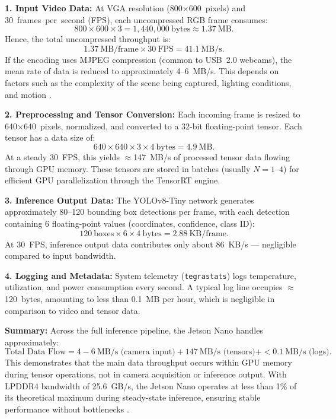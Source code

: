 \bigskip
\textbf{1. Input Video Data:}  
At VGA resolution (800$\times$600~pixels) and 30~frames~per~second (FPS), each uncompressed RGB frame consumes:
\[
800 \times 600 \times 3 = 1{,}440{,}000~\text{bytes} \approx 1.37~\text{MB}.
\]
Hence, the total uncompressed throughput is:
\[
1.37~\text{MB/frame} \times 30~\text{FPS} = 41.1~\text{MB/s}.
\]
If the encoding uses MJPEG compression (common to \ac{USB}~2.0 webcams), the mean rate of data is reduced to approximately 4–6~MB/s. This depends on factors such as the complexity of the scene being captured, lighting conditions, and motion \cite{linux_uvc_driver}.  

\bigskip
\textbf{2. Preprocessing and Tensor Conversion:}  
Each incoming frame is resized to 640$\times$640~pixels, normalized, and converted to a 32-bit floating-point tensor.  
Each tensor has a data size of:
\[
640 \times 640 \times 3 \times 4~\text{bytes} = 4.9~\text{MB}.
\]
At a steady 30~FPS, this yields $\approx$147~MB/s of processed tensor data flowing through \ac{GPU} memory.  
These tensors are stored in batches (usually $N=1$–$4$) for efficient \ac{GPU} parallelization through the TensorRT engine.

\bigskip
\textbf{3. Inference Output Data:}  
The YOLOv8-Tiny network generates approximately 80–120 bounding box detections per frame, with each detection containing 6 floating-point values (coordinates, confidence, class ID):
\[
120~\text{boxes} \times 6 \times 4~\text{bytes} = 2.88~\text{KB/frame}.
\]
At 30~FPS, inference output data contributes only about 86~KB/s — negligible compared to input bandwidth.  

\bigskip
\textbf{4. Logging and Metadata:}  
System telemetry (\texttt{tegrastats}) logs temperature, utilization, and power consumption every second.  
A typical log line occupies $\approx$120~bytes, amounting to less than 0.1~MB per hour, which is negligible in comparison to video and tensor data.

\bigskip
\textbf{Summary:}  
Across the full inference pipeline, the Jetson Nano handles approximately:
\[
\text{Total Data Flow} = 4{-}6~\text{MB/s (camera input)} + 147~\text{MB/s (tensors)} + <0.1~\text{MB/s (logs)}.
\]
This demonstrates that the main data throughput occurs within \ac{GPU} memory during tensor operations, not in camera acquisition or inference output.  
With LPDDR4 bandwidth of 25.6~GB/s, the Jetson Nano operates at less than 1\% of its theoretical maximum during steady-state inference, ensuring stable performance without bottlenecks \cite{jetsonNanoDatasheet,edgeAIbook}.  

